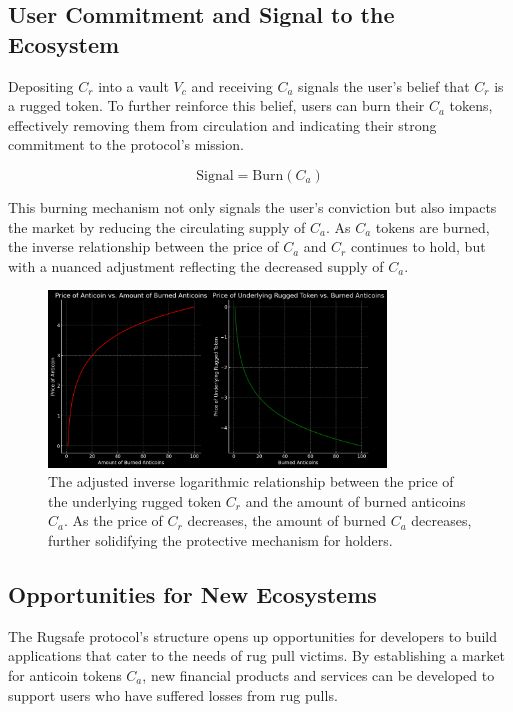 \documentclass{article}
\begin{document}
\subsection{User Commitment and Signal to the Ecosystem}
Depositing $C_r$ into a vault $V_c$ and receiving $C_a$ signals the user's belief that $C_r$ is a rugged token. To further reinforce this belief, users can burn their $C_a$ tokens, effectively removing them from circulation and indicating their strong commitment to the protocol's mission.

\begin{equation}
\text{Signal} = \text{Burn}(C_a)
\end{equation}

This burning mechanism not only signals the user's conviction but also impacts the market by reducing the circulating supply of $C_a$. As $C_a$ tokens are burned, the inverse relationship between the price of $C_a$ and $C_r$ continues to hold, but with a nuanced adjustment reflecting the decreased supply of $C_a$.

\begin{figure}[h]
\centering
\includegraphics[width=0.8\textwidth]{images/3.png}
\caption{The adjusted inverse logarithmic relationship between the price of the underlying rugged token $C_r$ and the amount of burned anticoins $C_a$. As the price of $C_r$ decreases, the amount of burned $C_a$ decreases, further solidifying the protective mechanism for holders.}
\label{fig:burned_anticoins}
\end{figure}






\subsection{Opportunities for New Ecosystems}
The Rugsafe protocol's structure opens up opportunities for developers to build applications that cater to the needs of rug pull victims. By establishing a market for anticoin tokens $C_a$, new financial products and services can be developed to support users who have suffered losses from rug pulls. 
\end{document}
